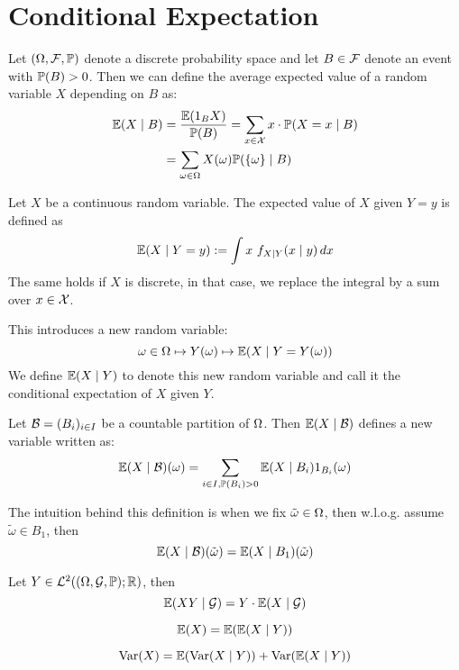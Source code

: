 \section{Conditional Expectation}
\begin{ddefinition*}
  Let \((\O, \F, \P)\) denote a discrete probability space and let \(B \in \F\) denote an event with \(\P(B) > 0\). Then we can define the average expected value of a random variable \(X\) depending on \(B\) as:
  \begin{align*}
    \E(X \mid B) &= \frac{\E(\I_B X)}{\P(B)} = \sum_{x \in \DX} x \cdot \P(X = x \mid B) \\
    &= \sum_{\omega \in \O} X(\omega) \P(\{\omega\} \mid B)
  \end{align*}
\end{ddefinition*}

\pagebreak
\begin{cdefinition*}
  Let \(X\) be a continuous random variable. The expected value of \(X\) given \(Y = y\) is defined as
  \[\E(X \mid Y = y) := \int x \ f_{X \mid Y}(x \mid y) \,dx\]
  The same holds if \(X\) is discrete, in that case, we replace the integral by a sum over \(x \in \DX\).
\end{cdefinition*}

This introduces a new random variable:
\[\omega \in \O \mapsto Y(\omega) \mapsto \E(X \mid Y = Y(\omega))\]
We define \(\E(X \mid Y)\) to denote this new random variable and call it the conditional expectation of \(X\) given \(Y\).

\begin{ddefinition*}
  Let \(\B = (B_i)_{i \in I}\) be a countable partition of \(\O\). Then \(\E(X \mid \B)\) defines a new variable written as:
  \[\E(X \mid \B)(\omega) = \sum_{i \in I, \P(B_i) > 0} \E(X \mid B_i) \I_{B_i}(\omega)\]
\end{ddefinition*}

The intuition behind this definition is when we fix \(\tilde{\omega} \in \O\), then w.l.o.g. assume \(\tilde{\omega} \in B_1\), then
\[\E(X \mid \B)(\tilde{\omega}) = \E(X \mid B_1)(\tilde{\omega})\]

\begin{dtheorem*}
  Let \(Y \in \L^2((\O, \mathcal{G}, \P); \R)\), then
  \[\E(XY \mid \mathcal{G}) = Y \cdot \E(X \mid \mathcal{G})\]
\end{dtheorem*}

\begin{theorem*} \vspace{-5pt}
  \[\E(X) = \E(\E(X \mid Y))\]
\end{theorem*}

\begin{theorem*} \vspace{-5pt}
  \[\Var(X) = \E(\Var(X \mid Y)) + \Var(\E(X \mid Y))\]
\end{theorem*}
